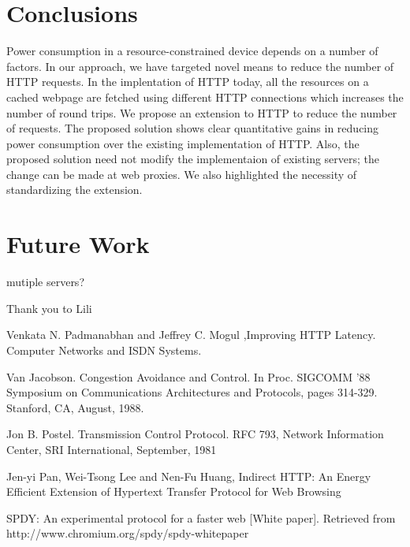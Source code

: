 \documentclass{sigplanconf}
\begin{document}
\section{Conclusions}

Power consumption in a resource-constrained device depends on a number of factors. In our approach, we have targeted novel means to reduce the number of HTTP requests. In the implentation of HTTP today, all the resources on a cached webpage are fetched using different HTTP connections which increases the number of round trips. We propose an extension to HTTP to reduce the number of requests. The proposed solution shows clear quantitative gains in reducing power consumption over the existing implementation of HTTP. Also, the proposed solution need not modify the implementaion of existing servers; the change can be made at web proxies. We also highlighted the necessity of standardizing the extension.

\section{Future Work}

mutiple servers?

\acks

Thank you to Lili





\begin{thebibliography}{}
\softraggedright

 Venkata N. Padmanabhan and Jeffrey C. Mogul ,Improving HTTP Latency. Computer Networks and ISDN Systems.

Van Jacobson. Congestion Avoidance and Control. In Proc. SIGCOMM ’88 Symposium on Communications Architectures and Protocols, pages 314-329. Stanford, CA, August, 1988.

Jon B. Postel. Transmission Control Protocol. RFC 793, Network Information Center, SRI International, September, 1981

Jen-yi Pan, Wei-Tsong Lee and Nen-Fu Huang, Indirect HTTP: An Energy Efficient Extension of Hypertext Transfer Protocol for Web Browsing

SPDY: An experimental protocol for a faster web [White paper]. Retrieved from http://www.chromium.org/spdy/spdy-whitepaper


\end{thebibliography}
\end{document}
